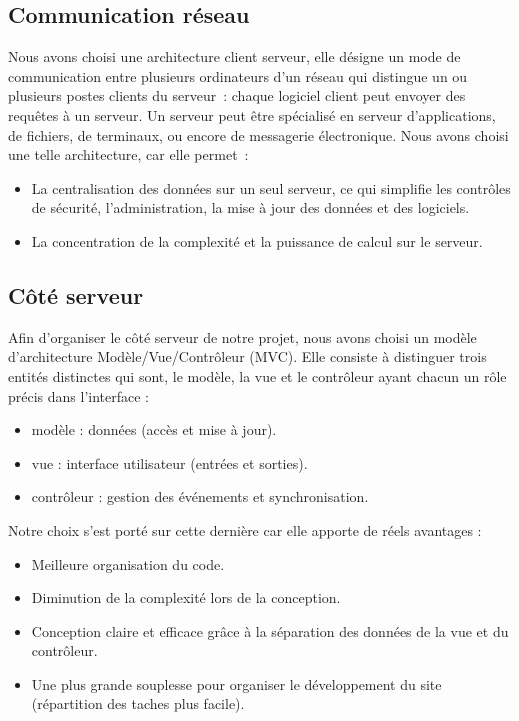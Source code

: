 \documentclass[12pt, openany]{report}
\begin{document}
\subsection{Communication réseau}
Nous avons choisi une architecture client serveur, elle désigne un mode de communication entre plusieurs ordinateurs d’un réseau qui distingue un ou plusieurs postes clients du serveur : chaque logiciel client peut envoyer des requêtes à un serveur. Un serveur peut être spécialisé en serveur d’applications, de fichiers, de terminaux, ou encore de messagerie électronique. Nous avons choisi une telle architecture, car elle permet :
\begin{itemize}
    \item  La centralisation des données sur un seul serveur, ce qui simplifie les contrôles de sécurité, l’administration, la mise à jour des données et des logiciels.
    \item La concentration de la complexité et la puissance de calcul sur le serveur.  
 \end{itemize}{}
\newline
\subsection{Côté serveur}
Afin d'organiser le côté serveur de notre projet, nous avons choisi un modèle d'architecture Modèle/Vue/Contrôleur (MVC). Elle consiste à distinguer trois entités distinctes qui sont, le modèle, la vue et le contrôleur ayant chacun un rôle précis dans l'interface :
\begin{itemize}
    \item modèle : données (accès et mise à jour).
    \item vue : interface utilisateur (entrées et sorties).
    \item contrôleur : gestion des événements et synchronisation.
\end{itemize}{}


Notre choix s'est porté sur cette dernière car elle apporte de réels avantages : 
\begin{itemize}
    \item Meilleure organisation du code.
    \item Diminution de la complexité lors de la conception.
    \item Conception claire et efficace grâce à la séparation des données de la vue et du contrôleur.
    \item Une plus grande souplesse pour organiser le développement du site (répartition des taches plus facile). 
\end{itemize}{}
\end{document}
